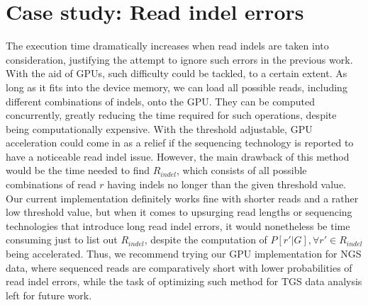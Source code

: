 \documentclass{PHlab-thesis}
\begin{document}
\section{Case study: Read indel errors}
The execution time dramatically increases when read indels are taken into consideration, justifying the attempt to ignore such errors in the previous work. With the aid of GPUs, such difficulty could be tackled, to a certain extent. As long as it fits into the device memory, we can load all possible reads, including different combinations of indels, onto the GPU. They can be computed concurrently, greatly reducing the time required for such operations, despite being computationally expensive. With the threshold adjustable, GPU acceleration could come in as a relief if the sequencing technology is reported to have a noticeable read indel issue. However, the main drawback of this method would be the time needed to find $R_{indel}$, which consists of all possible combinations of read $r$ having indels no longer than the given threshold value. Our current implementation definitely works fine with shorter reads and a rather low threshold value, but when it comes to upsurging read lengths or sequencing technologies that introduce long read indel errors, it would nonetheless be time consuming just to list out $R_{indel}$, despite the computation of $P[r'|G], \forall r' \in R_{indel}$ being accelerated. Thus, we recommend trying our GPU implementation for NGS data, where sequenced reads are comparatively short with lower probabilities of read indel errors, while the task of optimizing such method for TGS data analysis left for future work.
\end{document}
